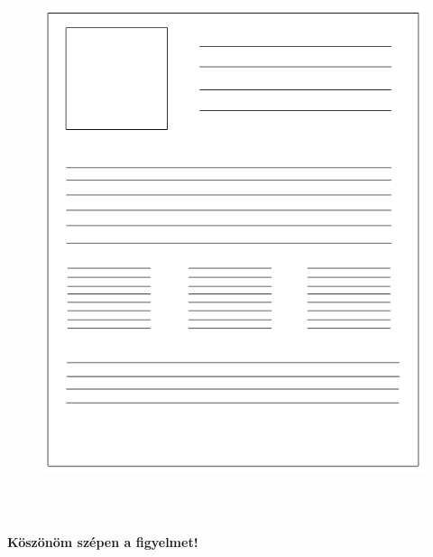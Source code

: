 \documentclass{beamer}
\begin{document}
\begin{frame}[fragile]
\begin{figure}[!tbp]
\begin{minipage}[b]{0.45\textwidth}
    \includegraphics[width=\textwidth]{images/page_complicated}
  \end{minipage}
\end{figure}

\end{frame}

\begin{frame}[fragile]
\frametitle{\ }

\begin{center}

    \Large

    \textbf{Köszönöm szépen a figyelmet!}

    \bigskip

\end{center}

\end{frame}
\end{document}
